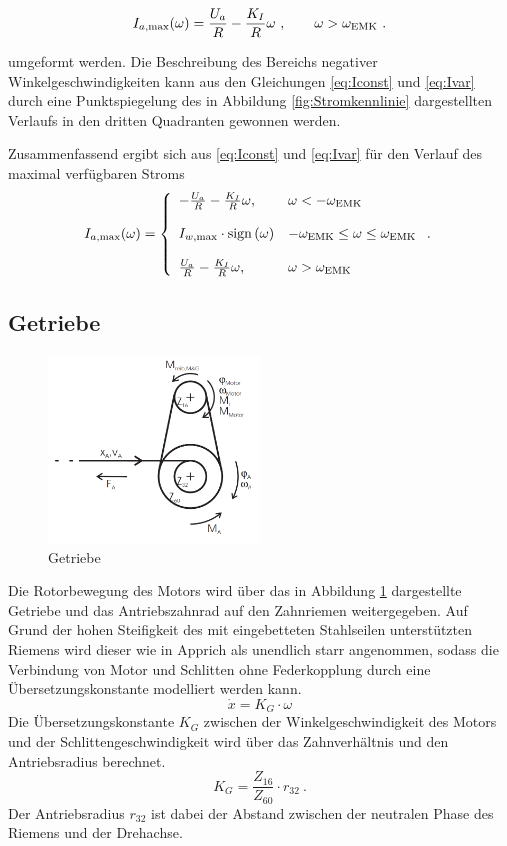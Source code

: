\begin{equation}
	I_{a \mathrm{, max}}(\omega) = \frac{U_a}{R} - \frac{K_I}{R} \omega \ , \qquad \omega > \omega_{\mathrm{EMK}} \ .
	\label{eq:Ivar}
\end{equation}

umgeformt werden.
Die Beschreibung des Bereichs negativer Winkelgeschwindigkeiten kann aus den Gleichungen \eqref{eq:Iconst} und \eqref{eq:Ivar} durch eine Punktspiegelung des in Abbildung \ref{fig:Stromkennlinie} dargestellten Verlaufs in den dritten Quadranten gewonnen werden.

Zusammenfassend ergibt sich aus \eqref{eq:Iconst} und \eqref{eq:Ivar} für den Verlauf des maximal verfügbaren Stroms  
\[
I_{a \mathrm{, max}}(\omega) = \left\{\begin{array}{lll}
														-\frac{U_a}{R} - \frac{K_I}{R} \omega, & \omega < -\omega_{\mathrm{EMK}}   \\ \\
														I_{w\mathrm{, max}} \cdot \mathrm{sign}\left(\omega\right) 	& -\omega_{\mathrm{EMK}} \leq \omega \leq \omega_{\mathrm{EMK}} \\ \\				
														\frac{U_a}{R} - \frac{K_I}{R} \omega, & \omega > \omega_{\mathrm{EMK}} \end{array}\right. . \
\] 

\subsection{Getriebe}

\begin{figure}[htbp]
	\centering
		\includegraphics[width=0.5\textwidth]{Bilder/Motor/Getriebe.PNG}
	\caption{Getriebe \cite{franke}}
	\label{fig:Getriebe}
\end{figure}

Die Rotorbewegung des Motors wird über das in Abbildung \ref{fig:Getriebe} dargestellte Getriebe und das Antriebszahnrad auf den Zahnriemen weitergegeben. Auf Grund der hohen Steifigkeit des mit eingebetteten Stahlseilen unterstützten Riemens wird dieser wie in Apprich \cite{apprich} als unendlich starr angenommen, sodass die Verbindung von Motor und Schlitten ohne Federkopplung durch eine Übersetzungskonstante modelliert werden kann.
\[
	\dot{x} = K_G \cdot \omega
\]
 Die Übersetzungskonstante $K_G$ zwischen der Winkelgeschwindigkeit des Motors und der Schlittengeschwindigkeit wird über das Zahnverhältnis und den Antriebsradius berechnet.
\[
	K_G =  \frac{Z_{16}}{Z_{60}} \cdot r_{32} \ .
\]
Der Antriebsradius $r_{32}$ ist dabei der Abstand zwischen der neutralen Phase des Riemens und der Drehachse.
